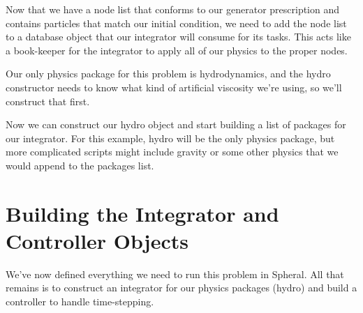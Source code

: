 \documentclass[11pt]{memoir}
\begin{document}
Now that we have a node list that conforms to our generator prescription and contains particles that match our initial condition, we need to add the node list to a database object that our integrator will consume for its tasks. This acts like a book-keeper for the integrator to apply all of our physics to the proper nodes.



Our only physics package for this problem is hydrodynamics, and the hydro constructor needs to know what kind of artificial viscosity we're using, so we'll construct that first.



Now we can construct our hydro object and start building a list of packages for our integrator. 
For this example, hydro will be the only physics package, but more complicated scripts might include gravity or some other physics that we would append to the packages list.



\section{Building the Integrator and Controller Objects}

We've now defined everything we need to run this problem in Spheral.
All that remains is to construct an integrator for our physics packages (hydro) and build a controller to handle time-stepping.




\end{document}
